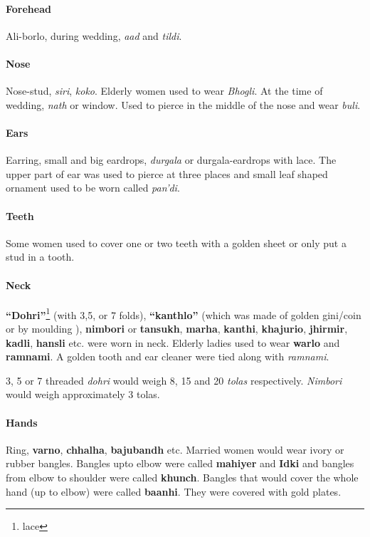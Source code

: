 \paragraph{Forehead} Ali-borlo, during wedding, \textit{aad} and \textit{tildi}.

\paragraph{Nose} Nose-stud, \textit{siri}, \textit{koko}. Elderly women used
to wear \textit{Bhogli}. At the time of wedding, \textit{nath} or window. Used
to pierce in the middle of the nose and wear \textit{buli}.

\paragraph{Ears} Earring, small and big eardrops, \textit{durgala} or
durgala-eardrops with lace. The upper part of ear was used to pierce at three
places and small leaf shaped ornament used to be worn called \textit{pan'di}.

\paragraph{Teeth} Some women used to cover one or two teeth with a golden
sheet or only put a stud in a tooth.

\paragraph{Neck} \textbf{``Dohri''}\footnote{lace} (with 3,5, or 7 folds), \textbf{``kanthlo''} (which was
made of golden gini/coin or by moulding ), \textbf{nimbori} or
\textbf{tansukh}, \textbf{marha}, \textbf{kanthi}, \textbf{khajurio},
\textbf{jhirmir}, \textbf{kadli}, \textbf{hansli} etc. were worn in neck.
Elderly ladies used to wear \textbf{warlo} and \textbf{ramnami}. A golden
tooth and ear cleaner were tied along with \textit{ramnami}.

3, 5 or 7 threaded \textit{dohri} would weigh 8, 15 and 20 \textit{tolas}
respectively. \textit{Nimbori} would weigh approximately 3 tolas.

\paragraph{Hands} Ring, \textbf{varno}, \textbf{chhalha}, \textbf{bajubandh}
etc. Married women would wear ivory or rubber bangles. Bangles upto elbow were
called \textbf{mahiyer} and \textbf{Idki} and bangles from elbow to shoulder were
called \textbf{khunch}. Bangles that would cover the whole hand (up to elbow)
were called \textbf{baanhi}. They were covered with gold plates.

